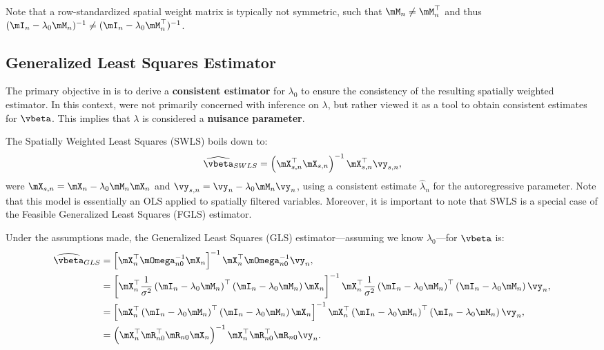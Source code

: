 Note that a row-standardized spatial weight matrix is typically not symmetric, such that $\mM_n\neq \mM_n^\top$ and thus $(\mI_n - \lambda_0\mM_n)^{-1}\neq (\mI_n - \lambda_0\mM_n^\top)^{-1}$.

\subsection{Generalized Least Squares Estimator}\label{sec:swls}

The primary objective in \cite{kelejian1999generalized} is to derive a \textbf{consistent estimator} for  $\lambda_0$ to ensure the consistency of the resulting spatially weighted estimator. In this context, \cite{kelejian1999generalized} were not primarily concerned with inference on $\lambda$, but rather viewed it as a tool to obtain consistent estimates for $\vbeta$. This implies that $\lambda$ is considered a \textbf{nuisance parameter}. 

The Spatially Weighted Least Squares (SWLS) boils down to:
\begin{equation}\label{eq:beta_swls}
  \widehat{\vbeta}_{SWLS} = \left(\mX_{s, n}^\top\mX_{s, n}\right)^{-1}\mX_{s, n}^\top\vy_{s, n},
\end{equation}
%
were $\mX_{s, n} = \mX_n - \lambda_0\mM_n\mX_n$ and $\vy_{s, n} = \vy_n - \lambda_0\mM_n\vy_n$, using a consistent estimate $\widehat{\lambda}_n$ for the autoregressive parameter. Note that this model is essentially an OLS applied to spatially filtered variables. Moreover, it is important to note that SWLS is a special case of the Feasible Generalized Least Squares (FGLS) estimator. 

Under the assumptions made, the Generalized Least Squares (GLS) estimator---assuming we know $\lambda_0$---for $\vbeta$ is:
\begin{equation*}
\begin{aligned}
\widehat{\vbeta}_{GLS}  & = \left[\mX^\top_n\mOmega^{-1}_{n0}\mX_n\right]^{-1}\mX^\top_n\mOmega^{-1}_{n0}\vy_n, \\
& = \left[\mX^\top_n\frac{1}{\sigma^2}\left(\mI_n - \lambda_0\mM_n\right)^\top\left(\mI_n - \lambda_0\mM_n\right)\mX_n\right]^{-1}\mX^\top_n\frac{1}{\sigma^2}\left(\mI_n -\lambda_0\mM_n\right)^\top\left(\mI_n - \lambda_0\mM_n\right)\vy_n,  \\
   & =\left[\mX^\top_n\left(\mI_n - \lambda_0\mM_n\right)^\top\left(\mI_n - \lambda_0\mM_n\right)\mX_n\right]^{-1}\mX^\top_n\left(\mI_n -\lambda_0\mM_n\right)^\top\left(\mI_n - \lambda_0\mM_n\right)\vy_n, \\
  & =\left(\mX_n^\top \mR_{n0}^\top\mR_{n0}\mX_n\right)^{-1} \mX_n^\top \mR_{n0}^\top\mR_{n0}\vy_n. 
\end{aligned}
\end{equation*}


